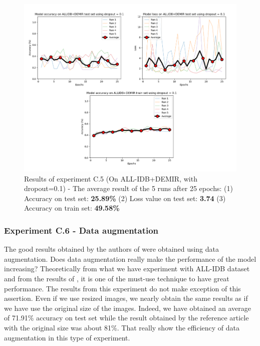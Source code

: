 \documentclass[11pt, openany]{report}
\theoremstyle{plain}
\theoremstyle{definition}
\theoremstyle{remark}
\begin{document}
\begin{figure}[H]
  \centering
  \includegraphics[scale=0.4]{Code/ch6-LeukemiaSubtypes/figures_result/LEUK-SUBTYPES/leukSub-dropout.PNG}
  \caption{Results of experiment C.5 (On ALL-IDB+DEMIR, with dropout=0.1) - The average result of the 5 runs after 25 epochs: (1) Accuracy on test set: \textbf{25.89\%} (2) Loss value on test set: \textbf{3.74} (3) Accuracy on train set: \textbf{49.58\%}}
  \label{fig:results-C5}
\end{figure}


\subsubsection{Experiment C.6 - Data augmentation}

The good results obtained by the authors of \citep{leukemia} were obtained using data augmentation. Does data augmentation really make the performance of the model increasing? Theoretically from what we have experiment with ALL-IDB dataset and from the results of \cite{leukemia}, it is one of the must-use technique to have great performance. The results from this experiment do not make exception of this assertion. Even if we use resized images, we nearly obtain the same results as if we have use the original size of the images. Indeed, we have obtained an average of 71.91\% accuracy on test set while the result obtained by the reference article \cite{leukemia} with the original size was about 81\%. That really show the efficiency of data augmentation in this type of experiment. 
\end{document}
